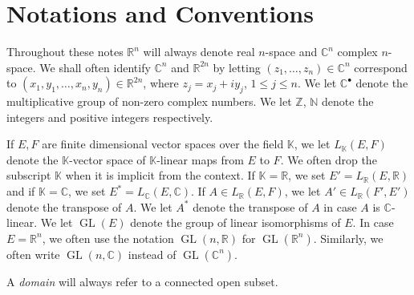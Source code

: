 \begingroup
\makeatletter
{}
\makeatother
\setlength{\parskip}{0pt}
\setlength{\abovedisplayskip}{6pt}
\setlength{\belowdisplayskip}{6pt}
\chapter*{Notations and Conventions}
Throughout these notes $\mathbb R^n$ will always denote real $n$-space and $\mathbb C^n$ complex $n$-space. We shall often identify $\mathbb C^n$ and $\mathbb R^{2n}$ by letting $(z_1,\ldots,z_n)\in\mathbb C^n$ correspond to $(x_1,y_1,\ldots,x_n,y_n)\in\mathbb R^{2n}$, where $z_j=x_j+iy_j$, $1\leq j\leq n$. We let $\mathbb C^\bullet$ denote the multiplicative group of non-zero complex numbers. We let $\mathbb Z$, $\mathbb N$ denote the integers and positive integers respectively.

If $E,F$ are finite dimensional vector spaces over the field $\mathbb K$, we let $L_{\mathbb K}(E,F)$ denote the $\mathbb K$-vector space of $\mathbb K$-linear maps from $E$ to $F$. We often drop the subscript $\mathbb K$ when it is implicit from the context. If $\mathbb K=\mathbb R$, we set $E'=L_{\mathbb R}(E,\mathbb R)$ and if $\mathbb K=\mathbb C$, we set $E^*=L_{\mathbb C}(E,\mathbb C)$. If $A\in L_{\mathbb R}(E,F)$, we let $A'\in L_{\mathbb R}(F',E')$ denote the transpose of $A$. We let $A^*$ denote the transpose of $A$ in case $A$ is $\mathbb C$-linear. We let $\operatorname{GL}(E)$ denote the group of linear isomorphisms of $E$. In case $E=\mathbb R^n$, we often use the notation $\operatorname{GL}(n,\mathbb R)$ for $\operatorname{GL}(\mathbb R^n)$. Similarly, we often write $\operatorname{GL}(n,\mathbb C)$ instead of $\operatorname{GL}(\mathbb C^n)$.

A \emph{domain} will always refer to a connected open subset.

